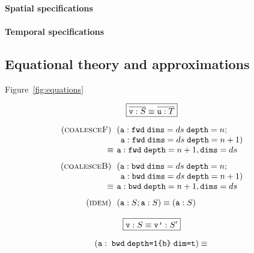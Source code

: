 \documentclass[9pt]{sigplanconf}
\theoremstyle{definition}
\begin{document}
\paragraph{Spatial specifications}


\paragraph{Temporal specifications}



\subsection{Equational theory and approximations}
\label{sec:eqs}

Figure~\ref{fig:equations}

\begin{figure}
\begin{align*}
\hspace{-1em}
\setlength{\arraycolsep}{0.05em}
\begin{array}{c}
\framebox{$\overline{\texttt{v} : S} \equiv \overline{\texttt{u} : T}$} \\[1em]
\begin{array}{rl}
(\textsc{coalesceF}) \;\; & (\texttt{a} : \texttt{fwd} \;
                       \texttt{dims}=ds \; \texttt{depth}=n; \\
&  \;\, \texttt{a} :  \texttt{fwd} \; \texttt{dims}=ds \; \texttt{depth}=n+1)\\
\equiv \; & \texttt{a} :  \texttt{fwd} \; \texttt{depth}=n+1,
         \texttt{dims}=ds \\[0.75em]
(\textsc{coalesceB}) \;\; & (\texttt{a} : \texttt{bwd} \;
                       \texttt{dims}=ds \; \texttt{depth}=n; \\
&  \;\, \texttt{a} :  \texttt{bwd} \; \texttt{dims}=ds \; \texttt{depth}=n+1) \\
\equiv \; & \texttt{a} :  \texttt{bwd} \; \texttt{depth}=n+1,
         \texttt{dims}=ds \\[0.75em]
(\textsc{idem}) \;\; & (\texttt{a} : S; \texttt{a} : S) \equiv (\texttt{a}
                  : S)
\end{array} \\ \\
\framebox{$\texttt{v} : S \equiv \texttt{v'} : S'$} \\[1em]
\begin{array}{ll}
(\texttt{a} : \; \texttt{bwd} \; \texttt{depth=1\{b\}} \;
  \texttt{dim=t})
\, & \equiv \,

\end{array}
\end{array}
\end{align*}
\end{figure}
\end{document}
